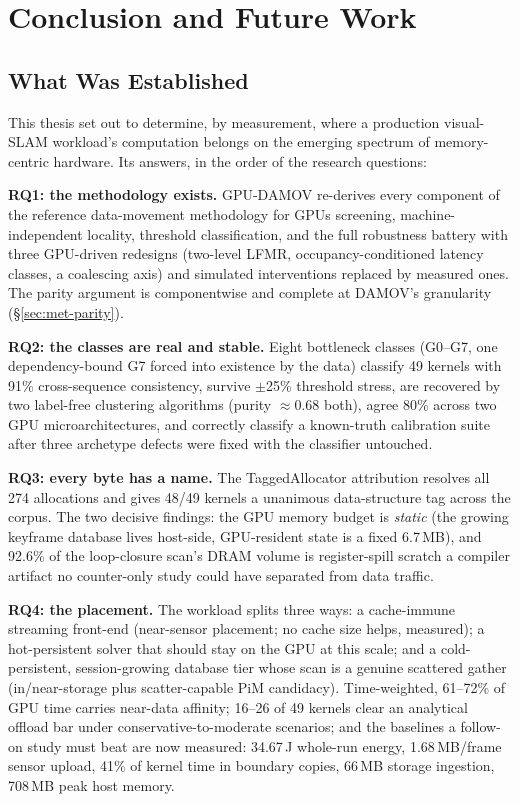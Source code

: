 \chapter{Conclusion and Future Work}
\label{ch:conclusion}

\section{What Was Established}

This thesis set out to determine, by measurement, where a production visual-SLAM workload's computation belongs on the emerging spectrum of memory-centric hardware. Its answers, in the order of the research questions:

\textbf{RQ1: the methodology exists.} GPU-DAMOV re-derives every component of the reference data-movement methodology for GPUs screening, machine-independent locality, threshold classification, and the full robustness battery with three GPU-driven redesigns (two-level LFMR, occupancy-conditioned latency classes, a coalescing axis) and simulated interventions replaced by measured ones. The parity argument is componentwise and complete at DAMOV's granularity (\S\ref{sec:met-parity}).

\textbf{RQ2: the classes are real and stable.} Eight bottleneck classes (G0--G7, one dependency-bound G7 forced into existence by the data) classify 49 kernels with 91\% cross-sequence consistency, survive $\pm$25\% threshold stress, are recovered by two label-free clustering algorithms (purity $\approx$0.68 both), agree 80\% across two GPU microarchitectures, and correctly classify a known-truth calibration suite after three archetype defects were fixed with the classifier untouched.

\textbf{RQ3: every byte has a name.} The TaggedAllocator attribution resolves all 274 allocations and gives 48/49 kernels a unanimous data-structure tag across the corpus. The two decisive findings: the GPU memory budget is \emph{static} (the growing keyframe database lives host-side, GPU-resident state is a fixed 6.7\,MB), and 92.6\% of the loop-closure scan's DRAM volume is register-spill scratch a compiler artifact no counter-only study could have separated from data traffic.

\textbf{RQ4: the placement.} The workload splits three ways: a cache-immune streaming front-end (near-sensor placement; no cache size helps, measured); a hot-persistent solver that should stay on the GPU at this scale; and a cold-persistent, session-growing database tier whose scan is a genuine scattered gather (in/near-storage plus scatter-capable PiM candidacy). Time-weighted, 61--72\% of GPU time carries near-data affinity; 16--26 of 49 kernels clear an analytical offload bar under conservative-to-moderate scenarios; and the baselines a follow-on study must beat are now measured: 34.67\,J whole-run energy, 1.68\,MB/frame sensor upload, 41\% of kernel time in boundary copies, 66\,MB storage ingestion, 708\,MB peak host memory.

